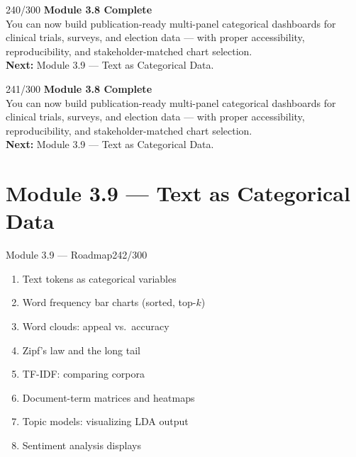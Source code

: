 \documentclass[10pt]{beamer}
\newcommand{\smark}[1]{\hfill{\scriptsize\color{codegray}#1}}
\begin{document}
\begin{frame}{}\smark{240/300}
\centering\vspace{1.5cm}
{\Large\textbf{Module 3.8 Complete}}\\[0.5cm]
You can now build publication-ready multi-panel categorical dashboards for clinical trials, surveys, and election data --- with proper accessibility, reproducibility, and stakeholder-matched chart selection.\\[0.5cm]
\textbf{Next:} Module 3.9 --- Text as Categorical Data.
\end{frame}

\begin{frame}{}\smark{241/300}
\centering\vspace{1.5cm}
{\Large\textbf{Module 3.8 Complete}}\\[0.5cm]
You can now build publication-ready multi-panel categorical dashboards for clinical trials, surveys, and election data --- with proper accessibility, reproducibility, and stakeholder-matched chart selection.\\[0.5cm]
\textbf{Next:} Module 3.9 --- Text as Categorical Data.
\end{frame}


\section{Module 3.9 --- Text as Categorical Data}

\begin{frame}{Module 3.9 --- Roadmap}\smark{242/300}
\begin{enumerate}
    \item Text tokens as categorical variables
    \item Word frequency bar charts (sorted, top-$k$)
    \item Word clouds: appeal vs.\ accuracy
    \item Zipf's law and the long tail
    \item TF-IDF: comparing corpora
    \item Document-term matrices and heatmaps
    \item Topic models: visualizing LDA output
    \item Sentiment analysis displays
\end{enumerate}
\end{frame}
\end{document}
